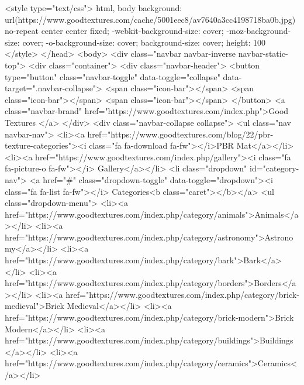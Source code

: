 	<style type="text/css">
        html, body {
                background: url(https://www.goodtextures.com/cache/5001eec8/av7640a3cc4198718ba0b.jpg) no-repeat center center fixed;
                         -webkit-background-size: cover;  -moz-background-size: cover;  -o-background-size: cover;  background-size: cover;  height: 100%
        }
    </style>
</head>
<body>
<div class="navbar navbar-inverse navbar-static-top">
    <div class="container">
        <div class="navbar-header">
            <button type="button" class="navbar-toggle" data-toggle="collapse" data-target=".navbar-collapse">
                <span class="icon-bar"></span>
                <span class="icon-bar"></span>
                <span class="icon-bar"></span>
            </button>
            <a class="navbar-brand" href="https://www.goodtextures.com/index.php">Good Textures </a>
        </div>
        <div class="navbar-collapse collapse">
            <ul class="nav navbar-nav">
				<li><a href="https://www.goodtextures.com/blog/22/pbr-texture-categories"><i class="fa fa-download fa-fw"></i>PBR Mat</a></li>
                <li><a href="https://www.goodtextures.com/index.php/gallery"><i class="fa fa-picture-o fa-fw"></i> Gallery</a></li>
                <li class="dropdown" id="category-nav">
                    <a href="#" class="dropdown-toggle" data-toggle="dropdown"><i class="fa fa-list fa-fw"></i> Categories<b class="caret"></b></a>
                    <ul class="dropdown-menu">
                                                    <li><a href="https://www.goodtextures.com/index.php/category/animals">Animals</a></li>
                                                    <li><a href="https://www.goodtextures.com/index.php/category/astronomy">Astronomy</a></li>
                                                    <li><a href="https://www.goodtextures.com/index.php/category/bark">Bark</a></li>
                                                    <li><a href="https://www.goodtextures.com/index.php/category/borders">Borders</a></li>
                                                    <li><a href="https://www.goodtextures.com/index.php/category/brick-medieval">Brick Medieval</a></li>
                                                    <li><a href="https://www.goodtextures.com/index.php/category/brick-modern">Brick Modern</a></li>
                                                    <li><a href="https://www.goodtextures.com/index.php/category/buildings">Buildings</a></li>
                                                    <li><a href="https://www.goodtextures.com/index.php/category/ceramics">Ceramics</a></li>
